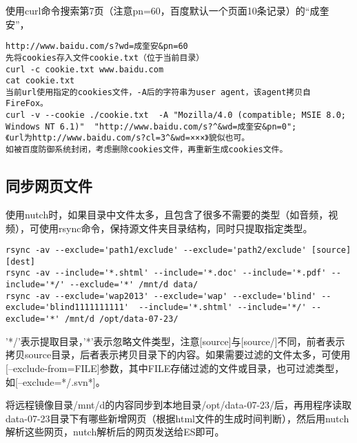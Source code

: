 \par 使用curl命令搜索第7页（注意pn=60，百度默认一个页面10条记录）的“成奎安”，
\begin{verbatim}
http://www.baidu.com/s?wd=成奎安&pn=60
先将cookies存入文件cookie.txt（位于当前目录）
curl -c cookie.txt www.baidu.com
cat cookie.txt
当前url使用指定的cookies文件，-A后的字符串为user agent，该agent拷贝自FireFox。
curl -v --cookie ./cookie.txt  -A "Mozilla/4.0 (compatible; MSIE 8.0; Windows NT 6.1)"  "http://www.baidu.com/s?^&wd=成奎安&pn=0";
《url为http://www.baidu.com/s?cl=3^&wd=×××》貌似也可。
如被百度防御系统封闭，考虑删除cookies文件，再重新生成cookies文件。
\end{verbatim}
\subsection{同步网页文件}
\par 使用nutch时，如果目录中文件太多，且包含了很多不需要的类型（如音频，视频），可使用rsync命令，保持源文件夹目录结构，同时只提取指定类型。
\begin{verbatim}
rsync -av --exclude='path1/exclude' --exclude='path2/exclude' [source] [dest]
rsync -av --include='*.shtml' --include='*.doc' --include='*.pdf' --include='*/' --exclude='*' /mnt/d data/
rsync -av --exclude='wap2013' --exclude='wap' --exclude='blind' --exclude='blind1111111111'  --include='*.shtml' --include='*/' --exclude='*' /mnt/d /opt/data-07-23/
\end{verbatim}
\par '*/'表示提取目录，'*'表示忽略文件类型，注意[source]与[source/]不同，前者表示拷贝source目录，后者表示拷贝目录下的内容。如果需要过滤的文件太多，可使用[--exclude-from=FILE]参数，其中FILE存储过滤的文件或目录，也可过滤类型，如[--exclude=*/.svn*]。
\par 将远程镜像目录/mnt/d的内容同步到本地目录/opt/data-07-23/后，再用程序读取data-07-23目录下有哪些新增网页（根据html文件的生成时间判断），然后用nutch解析这些网页，nutch解析后的网页发送给ES即可。

